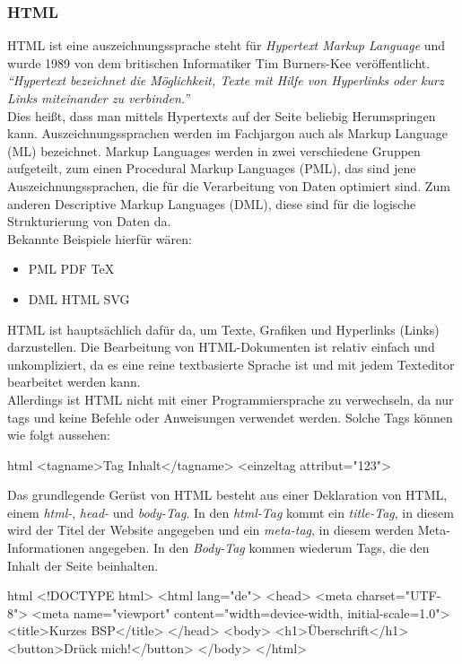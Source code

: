 		\subsubsection{HTML}
		HTML ist eine \Gls{auszeichnungssprache} steht für \textit{Hypertext Markup Language} und wurde 1989 von dem britischen Informatiker Tim Burners-Kee veröffentlicht.\\ 
		\textit{\enquote{Hypertext bezeichnet die Möglichkeit, Texte mit Hilfe von Hyperlinks oder kurz Links miteinander zu verbinden.}}\cite{html5-css3-def}\\ 
		Dies heißt, dass man mittels Hypertexts auf der Seite beliebig Herumspringen kann.
		Auszeichnungssprachen werden im Fachjargon auch als Markup Language (ML) bezeichnet. Markup Languages werden in zwei verschiedene Gruppen aufgeteilt, zum einen Procedural Markup Languages (PML), das sind jene Auszeichnungssprachen, die für die Verarbeitung von Daten optimiert sind. Zum anderen Descriptive Markup Languages (DML), diese sind für die logische Strukturierung von Daten da.\\Bekannte Beispiele hierfür wären:
		\begin{itemize}
		\item PML
		\subitem PDF
		\subitem TeX
		\item DML
		\subitem HTML
		\subitem SVG
		\end{itemize}
		HTML ist hauptsächlich dafür da, um Texte, Grafiken und Hyperlinks (Links) darzustellen. Die Bearbeitung von HTML-Dokumenten ist relativ einfach und unkompliziert, da es eine reine textbasierte Sprache ist und mit jedem Texteditor bearbeitet werden kann.\\
		Allerdings ist HTML nicht mit einer Programmiersprache zu verwechseln, da nur \Gls{tag}s und keine Befehle oder Anweisungen verwendet werden. Solche Tags können wie folgt aussehen:
		\begin{code}{html}
			<tagname>Tag Inhalt</tagname>
			<einzeltag attribut="123">
		\end{code}
		Das grundlegende Gerüst von HTML besteht aus einer Deklaration von HTML, einem \textit{html-}, \textit{head-} und \textit{body-Tag}. In den \textit{html-Tag} kommt ein \textit{title-Tag}, in diesem wird der Titel der Website angegeben und ein \textit{meta-tag}, in diesem werden Meta-Informationen angegeben. In den \textit{Body-Tag} kommen wiederum Tags, die den Inhalt der Seite beinhalten. 
		\begin{code}{html}
			<!DOCTYPE html>
			<html lang="de">
				<head>
					<meta charset="UTF-8">
					<meta name="viewport" content="width=device-width, initial-scale=1.0">
					<title>Kurzes BSP</title>
				</head>
				<body>
					<h1>Überschrift</h1>
					<button>Drück mich!</button>
				</body>
			</html>
		\end{code}
